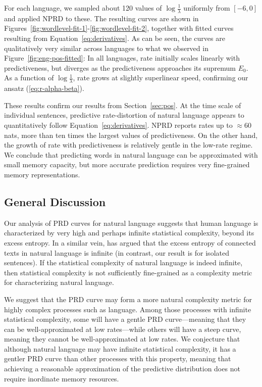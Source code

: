 \documentclass[entropy,article,submit,moreauthors,pdftex,10pt,a4paper]{Definitions/mdpi}
\begin{document}
For each language, we sampled about 120 values of $\log \frac{1}{\lambda}$ uniformly from $[-6, 0]$ and applied NPRD to these.
The resulting curves are shown in Figures~\ref{fig:wordlevel-fit-1}-\ref{fig:wordlevel-fit-2}, together with fitted curves resulting from Equation~\ref{eq:derivatives}.
As can be seen, the curves are qualitatively very similar across languages to what we observed in Figure~\ref{fig:eng-pos-fitted}:
In all languages, rate initially scales linearly with predictiveness, but diverges as the predictiveness approaches its supremum $E_0$.
As a function of $\log \frac{1}{\lambda}$, rate grows at slightly superlinear speed, confirming our ansatz (\ref{eq:r-alpha-beta}).

These results confirm our results from Section~\ref{sec:pos}.
At the time scale of individual sentences, predictive rate-distortion of natural language appears to quantitatively follow Equation~\ref{eq:derivatives}.
NPRD reports rates up to $\approx 60$ nats, more than ten times the largest values of predictiveness.
On the other hand, the growth of rate with predictiveness is relatively gentle in the low-rate regime.
We conclude that predicting words in natural language can be approximated with small memory capacity, but more accurate prediction requires very fine-grained memory representations.

\subsection{General Discussion}

Our analysis of PRD curves for natural language suggests that human language is characterized by very high and perhaps infinite statistical complexity, beyond its excess entropy. In a similar vein, \citet{dkebowski2018natural} has argued that the excess entropy of connected texts in natural language is infinite (in contrast, our result is for isolated sentences). If the statistical complexity of natural language is indeed infinite, then statistical complexity is not sufficiently fine-grained as a complexity metric for characterizing natural language. 

We suggest that the PRD curve may form a more natural complexity metric for highly complex processes such as language. Among those processes with infinite statistical complexity, some will have a gentle PRD curve---meaning that they can be well-approximated at low rates---while others will have a steep curve, meaning they cannot be well-approximated at low rates. We conjecture that although natural language may have infinite statistical complexity, it has a gentler PRD curve than other processes with this property, meaning that achieving a reasonable approximation of the predictive distribution does not require inordinate memory resources.
\end{document}
